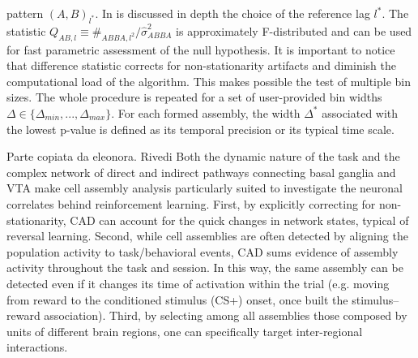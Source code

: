 pattern $(A,B)_{l^*}$. In \cite{RussoDurstewitz} is discussed in depth the choice of the reference lag $l^*$.
The statistic $Q_{AB,l}\equiv \#_{ABBA,l^2}/\hat{\sigma}_{ABBA}^2$ is approximately F-distributed and can be used for fast parametric assessment of the null hypothesis. It is important to notice that difference statistic corrects for non-stationarity artifacts and diminish the computational load of the algorithm. This makes possible the test of multiple bin sizes. The whole procedure is repeated for a set of user-provided bin widths $\Delta \in \{\Delta_{min},...,\Delta_{max}\}$. For each formed assembly, the width $\Delta^*$ associated with the lowest p-value is defined as its temporal precision or its typical time scale.

{\color{red} Parte copiata da eleonora. Rivedi}
Both the dynamic nature of the task and the complex network of direct and indirect pathways
connecting basal ganglia and VTA make cell assembly analysis particularly suited to investigate
the neuronal correlates behind reinforcement learning. First, by explicitly correcting for non-
stationarity, CAD can account for the quick changes in network states, typical of reversal
learning. Second, while cell assemblies are often detected by aligning the population activity to
task/behavioral events, CAD sums evidence of assembly activity throughout the task and
session. In this way, the same assembly can be detected even if it changes its time of activation
within the trial (e.g. moving from reward to the conditioned stimulus (CS+) onset, once built the
stimulus–reward association). Third, by selecting among all assemblies those composed by
units of different brain regions, one can specifically target inter-regional interactions.

